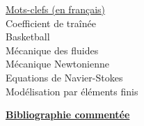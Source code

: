 \documentclass{article}
\begin{document}
\vspace{0.6cm}

\begin{adjustwidth}{80pt}{80pt}
	\begin{multicols}{2}

	\underline{ {\Large Mots-clefs (en français)} } \\
	\vspace{0.4cm}
	Coefficient de traînée \\
	Basketball \\
	Mécanique des fluides \\
	Mécanique Newtonienne \\
	Equations de Navier-Stokes \\
	Modélisation par éléments finis \\

	\columnbreak
	

	\end{multicols}
\end{adjustwidth}

\vspace{0.6cm}

\underline{\Large{\textbf{Bibliographie commentée}}} \\

\vspace{0.6cm}
\end{document}
